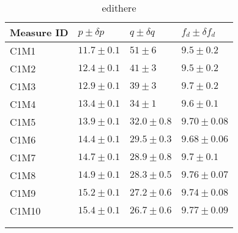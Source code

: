 \begin{longtable}{@{}llll@{}}
\toprule
Measure ID & $p \pm \delta p$ & $q \pm \delta q$ & $f_d \pm \delta f_d$ \tabularnewline
\midrule
C1M1 & $11.7 \pm 0.1$ & $51 \pm 6$ & $9.5 \pm 0.2$ \tabularnewline
C1M2 & $12.4 \pm 0.1$ & $41 \pm 3$ & $9.5 \pm 0.2$ \tabularnewline
C1M3 & $12.9 \pm 0.1$ & $39 \pm 3$ & $9.7 \pm 0.2$ \tabularnewline
C1M4 & $13.4 \pm 0.1$ & $34 \pm 1$ & $9.6 \pm 0.1$ \tabularnewline
C1M5 & $13.9 \pm 0.1$ & $32.0 \pm 0.8$ & $9.70 \pm 0.08$ \tabularnewline
C1M6 & $14.4 \pm 0.1$ & $29.5 \pm 0.3$ & $9.68 \pm 0.06$ \tabularnewline
C1M7 & $14.7 \pm 0.1$ & $28.9 \pm 0.8$ & $9.7 \pm 0.1$ \tabularnewline
C1M8 & $14.9 \pm 0.1$ & $28.3 \pm 0.5$ & $9.76 \pm 0.07$ \tabularnewline
C1M9 & $15.2 \pm 0.1$ & $27.2 \pm 0.6$ & $9.74 \pm 0.08$ \tabularnewline
C1M10 & $15.4 \pm 0.1$ & $26.7 \pm 0.6$ & $9.77 \pm 0.09$ \tabularnewline
\bottomrule
\label{tab:edithere}
\\
\caption{edithere}
\end{longtable}
